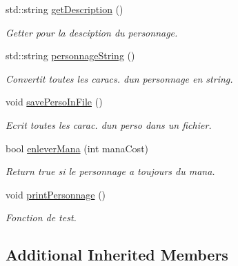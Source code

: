 \begin{DoxyCompactItemize}
\mbox{\label{classpersonnage_a3073012aade0ea1d809f39bc29681f88}} 
std\+::string \hyperlink{classpersonnage_a3073012aade0ea1d809f39bc29681f88}{get\+Description} ()
\begin{DoxyCompactList}\small\item\em Getter pour la desciption du personnage. \end{DoxyCompactList}\item 
\mbox{\label{classpersonnage_aaec203345eb344e180ead34612431267}} 
std\+::string \hyperlink{classpersonnage_aaec203345eb344e180ead34612431267}{personnage\+String} ()
\begin{DoxyCompactList}\small\item\em Convertit toutes les caracs. d\textquotesingle{}un personnage en string. \end{DoxyCompactList}\item 
\mbox{\label{classpersonnage_a50d0149c0f5d1aaa7375646c3bb2ab2b}} 
void \hyperlink{classpersonnage_a50d0149c0f5d1aaa7375646c3bb2ab2b}{save\+Perso\+In\+File} ()
\begin{DoxyCompactList}\small\item\em Ecrit toutes les carac. d\textquotesingle{}un perso dans un fichier. \end{DoxyCompactList}\item 
\mbox{\label{classpersonnage_a0cb9b3d7d2c2decae742de8086f28766}} 
bool \hyperlink{classpersonnage_a0cb9b3d7d2c2decae742de8086f28766}{enlever\+Mana} (int mana\+Cost)
\begin{DoxyCompactList}\small\item\em Return true si le personnage a toujours du mana. \end{DoxyCompactList}\item 
\mbox{\label{classpersonnage_a173f1b07d9098a96fd189ede2e7dad59}} 
void \hyperlink{classpersonnage_a173f1b07d9098a96fd189ede2e7dad59}{print\+Personnage} ()
\begin{DoxyCompactList}\small\item\em Fonction de test. \end{DoxyCompactList}\end{DoxyCompactItemize}
\subsection*{Additional Inherited Members}


